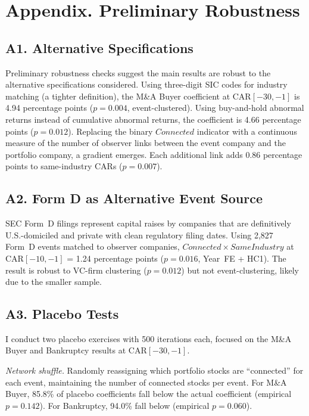 \section*{Appendix. Preliminary Robustness}

\subsection*{A1. Alternative Specifications}

Preliminary robustness checks suggest the main results are robust to the alternative specifications considered. Using three-digit SIC codes for industry matching (a tighter definition), the M\&A Buyer coefficient at CAR$[-30,-1]$ is 4.94 percentage points ($p=0.004$, event-clustered). Using buy-and-hold abnormal returns instead of cumulative abnormal returns, the coefficient is 4.66 percentage points ($p=0.012$). Replacing the binary $Connected$ indicator with a continuous measure of the number of observer links between the event company and the portfolio company, a gradient emerges. Each additional link adds 0.86 percentage points to same-industry CARs ($p=0.007$).

\subsection*{A2. Form D as Alternative Event Source}

SEC Form~D filings represent capital raises by companies that are definitively U.S.-domiciled and private with clean regulatory filing dates. Using 2,827 Form~D events matched to observer companies, $Connected \times SameIndustry$ at CAR$[-10,-1]$ = 1.24 percentage points ($p=0.016$, Year~FE + HC1). The result is robust to VC-firm clustering ($p=0.012$) but not event-clustering, likely due to the smaller sample.

\subsection*{A3. Placebo Tests}

I conduct two placebo exercises with 500 iterations each, focused on the M\&A Buyer and Bankruptcy results at CAR$[-30,-1]$.

\textit{Network shuffle.} Randomly reassigning which portfolio stocks are ``connected'' for each event, maintaining the number of connected stocks per event. For M\&A Buyer, 85.8\% of placebo coefficients fall below the actual coefficient (empirical $p=0.142$). For Bankruptcy, 94.0\% fall below (empirical $p=0.060$).

